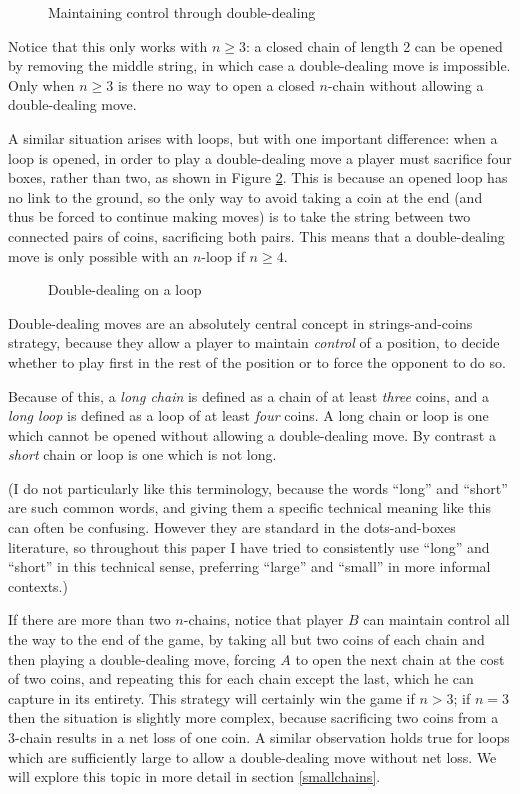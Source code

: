 \documentclass[a4paper,twocolumn]{article}
\begin{document}
\begin{figure}
  \centering
  \def\svgscale{0.7}
  
  \caption{Maintaining control through double-dealing}
  \label{dddemo}
\end{figure}

Notice that this only works with $n \ge 3$: a closed chain of length 2
can be opened by removing the middle string, in which case a
double-dealing move is impossible. Only when $n \ge 3$ is there no way
to open a closed $n$-chain without allowing a double-dealing move.

A similar situation arises with loops, but with one important
difference: when a loop is opened, in order to play a double-dealing
move a player must sacrifice four boxes, rather than two, as shown in
Figure \ref{loopdoubledeal}. This is because an opened loop has no
link to the ground, so the only way to avoid taking a coin at the end
(and thus be forced to continue making moves) is to take the string
between two connected pairs of coins, sacrificing both pairs. This
means that a double-dealing move is only possible with an $n$-loop if
$n \ge 4$.

\begin{figure}
  \centering
  \def\svgscale{0.7}
  
  \caption{Double-dealing on a loop}
  \label{loopdoubledeal}
\end{figure}

Double-dealing moves are an absolutely central concept in
strings-and-coins strategy, because they allow a player to maintain
\emph{control} of a position, to decide whether to play first in the
rest of the position or to force the opponent to do so.

Because of this, a \emph{long chain} is defined as a chain of at least
\emph{three} coins, and a \emph{long loop} is defined as a loop of at
least \emph{four} coins. A long chain or loop is one which cannot be
opened without allowing a double-dealing move. By contrast a
\emph{short} chain or loop is one which is not long.

(I do not particularly like this terminology, because the words
``long'' and ``short'' are such common words, and giving them a
specific technical meaning like this can often be confusing. However
they are standard in the dots-and-boxes literature, so throughout this
paper I have tried to consistently use ``long'' and ``short'' in this
technical sense, preferring ``large'' and ``small'' in more informal
contexts.)

If there are more than two $n$-chains, notice that player $B$ can
maintain control all the way to the end of the game, by taking all but
two coins of each chain and then playing a double-dealing move,
forcing $A$ to open the next chain at the cost of two coins, and
repeating this for each chain except the last, which he can capture in
its entirety. This strategy will certainly win the game if $n>3$; if
$n=3$ then the situation is slightly more complex, because sacrificing
two coins from a 3-chain results in a net loss of one coin. A similar
observation holds true for loops which are sufficiently large to allow
a double-dealing move without net loss. We will explore this topic in
more detail in section \ref{smallchains}.
\end{document}
